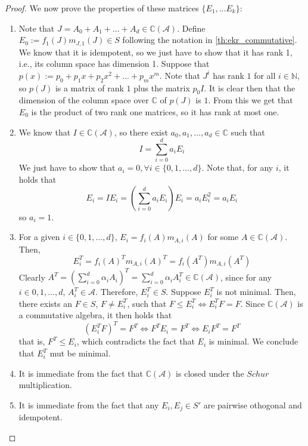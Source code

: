 \documentclass[a4paper,12pt]{article}
\theoremstyle{plain}
\theoremstyle{definition}
\theoremstyle{remark}
\begin{document}
\begin{proof}
    We now prove the properties of these matrices $ \{ E_1, \dots E_k \} $:
    \begin{enumerate}[label=(\roman*)]
        \item Note that $ J = A_0 + A_1 + \dots + A_d \in \mathbb{C}(\mathcal{A})  $.
            Define $ E_0 := f_1(J)m_{J,1}(J) \in S $ following the notation in
            \ref{th:ekr_commutative}. We know that it is idempotent, so we
            just have to show that it has rank 1, i.e., its column space has
            dimension 1. Suppose that
            $ p(x) := p_0 + p_1 x + p_2 x^2 + \dots + p_m x^m $.
            Note that $ J^i $ has rank $ 1 $ for all $ i \in \mathbb{N} $,
            so $ p(J) $ is a matrix of rank $ 1 $ plus the matrix $ p_0 I $.
            It is clear then that the dimension of the column space over
            $ \mathbb{C} $ of $ p(J) $ is $ 1 $. From this we get that $ E_0 $
            is the product of two rank one matrices, so it has rank at most
            one.
        \item We know that $ I \in \mathbb{C}(\mathcal{A}) $, so there exist
            $ a_0, a_1, \dots, a_d \in \mathbb{C} $ such that
            \[ I = \sum_{ i=0 }^{ d } a_iE_i \]
            We just have to show that $ a_i = 0,\forall i \in \{ 0,1,\dots,d \} $.
            Note that, for any $ i $, it holds that
            \[ E_i = I E_i = (\sum_{ i=0 }^{ d } a_iE_i) E_i = a_i E_i^2
            = a_i E_i \]
            so $ a_i = 1 $.
        \item For a given $ i \in \{ 0,1, \dots, d \} $,
            $ E_i = f_i(A)m_{A,i}(A) $ for some
            $ A \in \mathbb{C}(\mathcal{A}) $. Then,
            \[ E_i^T = f_i(A)^T m_{A,i}(A)^T = f_i(A^T) m_{A,i}(A^T) \]
            Clearly $ A^T = (\sum_{ i=0 }^{ d } \alpha_i A_i )^T =
            \sum_{ i=0 }^{ d } \alpha_i A_i^T \in \mathbb{C}(\mathcal{A}) $,
            since for any $ i \in {0,1,\dots,d} $, $ A_i^T \in \mathcal{A} $.
            Therefore, $ E_i^T \in S $. Suppose $ E_i^T $ is not minimal.
            Then, there exists an $ F \in S $, $ F \neq E_i^T $, such that
            $ F \leq E_i^T \iff E_i^TF = F $. Since $ \mathbb{C}(\mathcal{A}) $
            is a commutative algebra, it then holds that
            \[ (E_i^TF)^T = F^T \iff F^T E_i = F^T \iff E_i F^T = F^T \]
            that is, $ F^T \leq E_i $, which contradicts the fact that $ E_i $
            is minimal. We conclude that $ E_i^T $ mut be minimal.
        \item It is immediate from the fact that $ \mathbb{C}(\mathcal{A}) $
            is closed under the $ Schur $ multiplication.
        \item It is immediate from the fact that any $ E_i, E_j \in S' $ are
            pairwise othogonal and idempotent.
    \end{enumerate}
\end{proof}
\end{document}
